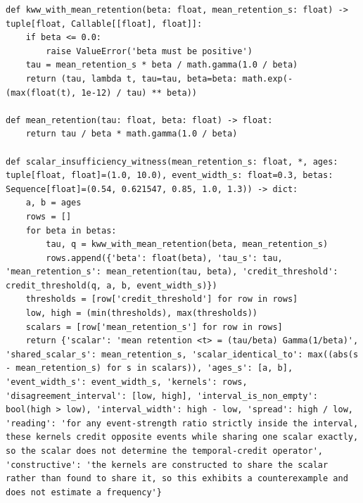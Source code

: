 \documentclass[a4paper,10pt]{article}
\begin{document}
\begin{Verbatim}
def kww_with_mean_retention(beta: float, mean_retention_s: float) -> tuple[float, Callable[[float], float]]:
    if beta <= 0.0:
        raise ValueError('beta must be positive')
    tau = mean_retention_s * beta / math.gamma(1.0 / beta)
    return (tau, lambda t, tau=tau, beta=beta: math.exp(-(max(float(t), 1e-12) / tau) ** beta))

def mean_retention(tau: float, beta: float) -> float:
    return tau / beta * math.gamma(1.0 / beta)

def scalar_insufficiency_witness(mean_retention_s: float, *, ages: tuple[float, float]=(1.0, 10.0), event_width_s: float=0.3, betas: Sequence[float]=(0.54, 0.621547, 0.85, 1.0, 1.3)) -> dict:
    a, b = ages
    rows = []
    for beta in betas:
        tau, q = kww_with_mean_retention(beta, mean_retention_s)
        rows.append({'beta': float(beta), 'tau_s': tau, 'mean_retention_s': mean_retention(tau, beta), 'credit_threshold': credit_threshold(q, a, b, event_width_s)})
    thresholds = [row['credit_threshold'] for row in rows]
    low, high = (min(thresholds), max(thresholds))
    scalars = [row['mean_retention_s'] for row in rows]
    return {'scalar': 'mean retention <t> = (tau/beta) Gamma(1/beta)', 'shared_scalar_s': mean_retention_s, 'scalar_identical_to': max((abs(s - mean_retention_s) for s in scalars)), 'ages_s': [a, b], 'event_width_s': event_width_s, 'kernels': rows, 'disagreement_interval': [low, high], 'interval_is_non_empty': bool(high > low), 'interval_width': high - low, 'spread': high / low, 'reading': 'for any event-strength ratio strictly inside the interval, these kernels credit opposite events while sharing one scalar exactly, so the scalar does not determine the temporal-credit operator', 'constructive': 'the kernels are constructed to share the scalar rather than found to share it, so this exhibits a counterexample and does not estimate a frequency'}
\end{Verbatim}
\end{document}
